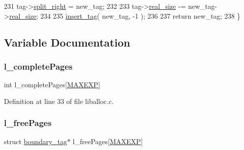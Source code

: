 \begin{DoxyCode}
231                         tag->\hyperlink{a00095_a9d43c9c4ff5ae35908dcfed0aec1907a_a9d43c9c4ff5ae35908dcfed0aec1907a}{split\_right} = new\_tag;
232     
233                         tag->\hyperlink{a00095_ad22b1c69bdce419783ac165f7f354245_ad22b1c69bdce419783ac165f7f354245}{real\_size} -= new\_tag->\hyperlink{a00095_ad22b1c69bdce419783ac165f7f354245_ad22b1c69bdce419783ac165f7f354245}{real\_size};
234     
235                         \hyperlink{a00023_a569f88ed08d8435e256dd225afcd26df_a569f88ed08d8435e256dd225afcd26df}{insert\_tag}( new\_tag, -1 );
236     
237     \textcolor{keywordflow}{return} new\_tag;
238 \}
\end{DoxyCode}


\subsection{Variable Documentation}
\mbox{\label{a00023_a213db3baf1d4b13d604015489247980d_a213db3baf1d4b13d604015489247980d}} 
\subsubsection{\texorpdfstring{l\+\_\+complete\+Pages}{l\_completePages}}
{\footnotesize\ttfamily int l\+\_\+complete\+Pages\mbox{[}\hyperlink{a00023_af823bb7d083fafbd662be7ea09582013_af823bb7d083fafbd662be7ea09582013}{M\+A\+X\+E\+XP}\mbox{]}}



Definition at line 33 of file liballoc.\+c.

\mbox{\label{a00023_a78b8b6e448179d3cd64915f99fee60e0_a78b8b6e448179d3cd64915f99fee60e0}} 
\subsubsection{\texorpdfstring{l\+\_\+free\+Pages}{l\_freePages}}
{\footnotesize\ttfamily struct \hyperlink{a00095}{boundary\+\_\+tag}$\ast$ l\+\_\+free\+Pages\mbox{[}\hyperlink{a00023_af823bb7d083fafbd662be7ea09582013_af823bb7d083fafbd662be7ea09582013}{M\+A\+X\+E\+XP}\mbox{]}}



